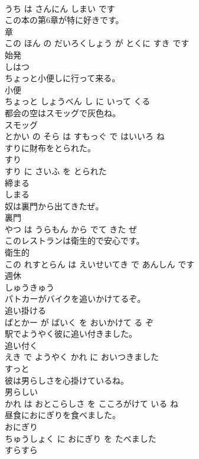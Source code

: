 \documentclass[8pt]{extreport}
\begin{document}
\begin{CJK}{UTF8}{min}
\\	うち は さんにん しまい です			
\\	この本の第6章が特に好きです。	
\\	章 
\\	この ほん の だいろくしょう が とくに すき です			
\\	始発	
\\	しはつ		
\\	ちょっと小便しに行って来る。	
\\	小便 
\\	ちょっと しょうべん し に いって くる			
\\	都会の空はスモッグで灰色ね。	
\\	スモッグ 
\\	とかい の そら は すもっぐ で はいいろ ね			
\\	すりに財布をとられた。	
\\	すり 
\\	すり に さいふ を とられた			
\\	締まる	
\\	しまる		
\\	奴は裏門から出てきたぜ。	
\\	裏門 
\\	やつ は うらもん から でて きた ぜ			
\\	このレストランは衛生的で安心です。	
\\	衛生的 
\\	この れすとらん は えいせいてき で あんしん です			
\\	週休	
\\	しゅうきゅう		
\\	パトカーがバイクを追いかけてるぞ。	
\\	追い掛ける 
\\	ぱとかー が ばいく を おいかけて る ぞ			
\\	駅でようやく彼に追い付きました。	
\\	追い付く 
\\	えき で ようやく かれ に おいつきました			
\\	すっと	
\\	彼は男らしさを心掛けているね。	
\\	男らしい 
\\	かれ は おとこらしさ を こころがけて いる ね			
\\	昼食におにぎりを食べました。	
\\	おにぎり 
\\	ちゅうしょく に おにぎり を たべました			
\\	すらすら	

\end{CJK}
\end{document}

